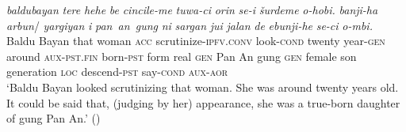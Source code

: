 \documentclass{article}
\newcommand{\ipa}[1]{\textit{{\phon\mbox{#1}}}} %
\begin{document}
\begin{exe}
\ex 
\gll \ipa{baldubayan} 	\ipa{tere} 	\ipa{hehe} 	\ipa{be} 	\ipa{cincile-me} 	\ipa{tuwa-ci} 	\ipa{orin} 	\ipa{se-i} 	\ipa{šurdeme} 	\ipa{o-hobi.} 	\ipa{banji-ha} 	\ipa{arbun}/ 	\ipa{yargiyan} 	\ipa{i} 	\ipa{pan an gung} 	\ipa{ni} 	\ipa{sargan} 	\ipa{jui} 	\ipa{jalan} 	\ipa{de} 	\ipa{ebunji-he} 	\ipa{se-ci} 	\ipa{o-mbi.} \\
{Baldu Bayan} that woman \textsc{acc} scrutinize-\textsc{ipfv.conv} look-\textsc{cond} twenty year-\textsc{gen} around \textsc{aux-pst.fin}  born-\textsc{pst} form real \textsc{gen} {Pan An gung} \textsc{gen} female son generation \textsc{loc} descend-\textsc{pst} say-\textsc{cond} \textsc{aux-aor} \\
\glt `Baldu Bayan looked scrutinizing that woman. She was around twenty years old. It could be said that, (judging by her) appearance, she was a true-born daughter of gung Pan An.' (\citealt[71,6a-6b/100]{jaxontov93nisan})
\end{exe}



\end{document}
